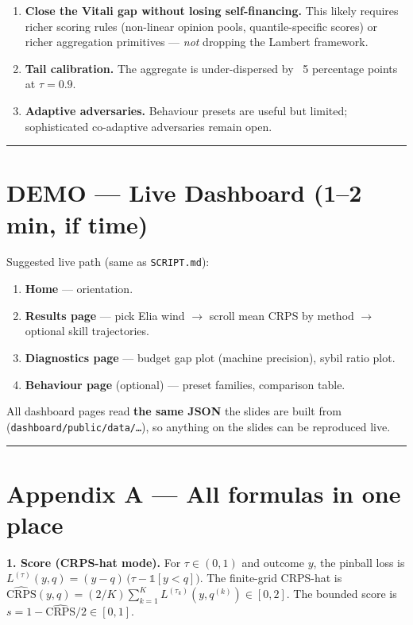 \documentclass[11pt]{article}
\begin{document}
\begin{enumerate}
\item \textbf{Close the Vitali gap without losing self-financing.} This likely requires richer scoring rules (non-linear opinion pools, quantile-specific scores) or richer aggregation primitives --- \emph{not} dropping the Lambert framework.
\item \textbf{Tail calibration.} The aggregate is under-dispersed by ~5 percentage points at $\tau = 0.9$.
\item \textbf{Adaptive adversaries.} Behaviour presets are useful but limited; sophisticated co-adaptive adversaries remain open.
\end{enumerate}

\bigskip\hrule\bigskip

\section{DEMO --- Live Dashboard (1--2 min, if time)}


Suggested live path (same as \texttt{SCRIPT.md}):

\begin{enumerate}
\item \textbf{Home} --- orientation.
\item \textbf{Results page} --- pick Elia wind $\rightarrow$ scroll mean CRPS by method $\rightarrow$ optional skill trajectories.
\item \textbf{Diagnostics page} --- budget gap plot (machine precision), sybil ratio plot.
\item \textbf{Behaviour page} (optional) --- preset families, comparison table.
\end{enumerate}

All dashboard pages read \textbf{the same JSON} the slides are built from (\texttt{dashboard/public/data/\ldots{}}), so anything on the slides can be reproduced live.

\bigskip\hrule\bigskip

\section{Appendix A --- All formulas in one place}


\textbf{1. Score (CRPS-hat mode).} For $\tau \in (0,1)$ and outcome $y$, the pinball loss is
$L^{(\tau)}(y, q) = (y - q)\,\bigl(\tau - \mathbb 1[y < q]\bigr)$. The finite-grid CRPS-hat is
$\widehat{\text{CRPS}}(y, q) = (2/K)\sum_{k=1}^K L^{(\tau_k)}(y, q^{(k)}) \in [0, 2]$.
The bounded score is $s = 1 - \widehat{\text{CRPS}}/2 \in [0, 1]$.
\end{document}
